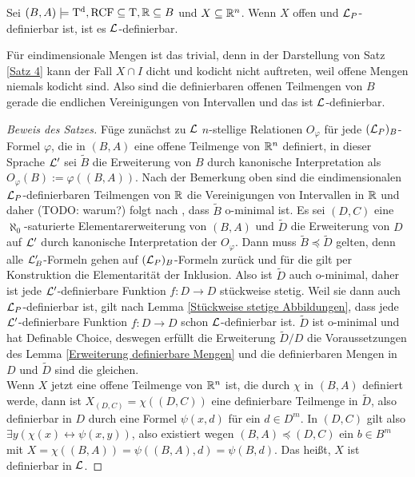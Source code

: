 \begin{theorem}
	Sei $(B,A)\models\operatorname{T^d},\operatorname{RCF}\subseteq\operatorname{T},\mathbb{R}\subseteq B$ und $X\subseteq \mathbb{R}^n$. Wenn $X$ offen und $\mathcal{L}_P$-definierbar ist, ist es $\mathcal{L}$-definierbar.
\end{theorem}
\begin{remark}
	Für eindimensionale Mengen ist das trivial, denn in der Darstellung von Satz \ref{Satz 4} kann der Fall $X\cap I$ dicht und kodicht nicht auftreten, weil offene Mengen niemals kodicht sind. Also sind die definierbaren offenen Teilmengen von $B$ gerade die endlichen Vereinigungen von Intervallen und das ist $\mathcal{L}$-definierbar.
\end{remark}
\begin{proof}[Beweis des Satzes]
	Füge zunächst zu $\mathcal{L}$ $n$-stellige Relationen $O_\varphi$ für jede $(\mathcal{L}_P)_B$-Formel $\varphi$, die in $(B,A)$ eine offene Teilmenge von $\mathbb{R}^n$ definiert, in dieser Sprache $\mathcal{L}'$ sei $\tilde{B}$ die Erweiterung von $B$ durch kanonische Interpretation als $O_\varphi(B):=\varphi((B,A))$. Nach der Bemerkung oben sind die eindimensionalen $\mathcal{L}_P$-definierbaren Teilmengen von $\mathbb{R}$ die Vereinigungen von Intervallen in $\mathbb{R}$ und daher (TODO: warum?) folgt nach \cite{MillSpeiss}, dass $\tilde{B}$ o-minimal ist. Es sei $(D,C)$ eine $\aleph_0$-saturierte Elementarerweiterung von $(B,A)$ und $\tilde{D}$ die Erweiterung von $D$ auf $\mathcal{L}'$ durch kanonische Interpretation der $O_\varphi$. Dann muss $\tilde{B}\preceq\tilde{D}$ gelten, denn alle $\mathcal{L}'_B$-Formeln gehen auf $(\mathcal{L}_P)_B$-Formeln zurück und für die gilt per Konstruktion die Elementarität der Inklusion. Also ist $\tilde{D}$ auch o-minimal, daher ist jede $\mathcal{L}'$-definierbare Funktion $f:D\rightarrow D$ stückweise stetig. Weil sie dann auch $\mathcal{L}_P$-definierbar ist, gilt nach Lemma \ref{Stückweise stetige Abbildungen}, dass jede $\mathcal{L}'$-definierbare Funktion $f:D\rightarrow D$ schon $\mathcal{L}$-definierbar ist. $\tilde{D}$ ist o-minimal und hat Definable Choice, deswegen erfüllt die Erweiterung $\tilde{D}/D$ die Voraussetzungen des Lemma \ref{Erweiterung definierbare Mengen} und die definierbaren Mengen in $D$ und $\tilde{D}$ sind die gleichen.\\
	Wenn $X$ jetzt eine offene Teilmenge von $\mathbb{R}^n$ ist, die durch $\chi$ in $(B,A)$ definiert werde, dann ist $X_{(D,C)}=\chi((D,C))$ eine definierbare Teilmenge in $\tilde{D}$, also definierbar in $D$ durch eine Formel $\psi(x,d)$ für ein $d\in D^m$. In $(D,C)$ gilt also $\exists y(\chi(x)\leftrightarrow\psi(x,y))$, also existiert wegen $(B,A)\preceq(D,C)$ ein $b\in B^m$ mit $X=\chi((B,A))=\psi((B,A),d)=\psi(B,d)$. Das heißt, $X$ ist definierbar in $\mathcal{L}$.
\end{proof}
